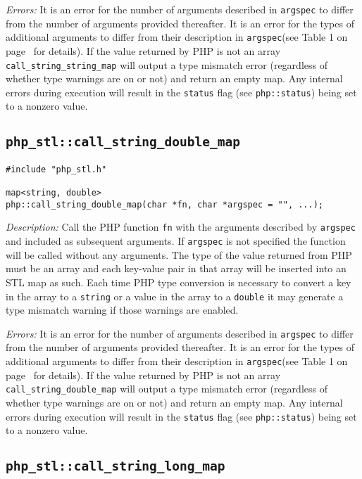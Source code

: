 \documentclass[11pt,titlepage]{article}
\begin{document}
\emph{Errors:} It is an error for the number of arguments described in \verb|argspec| to differ from the number of arguments provided thereafter. It is an error for the types of additional arguments to differ from their description in \verb|argspec|(see Table 1 on page~\pageref{Table1} for details). If the value returned by PHP is not an array \verb|call_string_string_map| will output a type mismatch error (regardless of whether type warnings are on or not) and return an empty map. Any internal errors during execution will result in the \verb|status| flag (see \verb|php::status|) being set to a nonzero value.


\subsection{\texttt{php\_stl::call\_string\_double\_map}}

\begin{verbatim}
#include "php_stl.h"

map<string, double> 
php::call_string_double_map(char *fn, char *argspec = "", ...);
\end{verbatim}

\emph{Description:} Call the PHP function \verb|fn| with the arguments described by \verb|argspec| and included as subsequent arguments. If \verb|argspec| is not specified the function will be called without any arguments. The type of the value returned from PHP must be an array and each key-value pair in that array will be inserted into an STL map as such. Each time PHP type conversion is necessary to convert a key in the array to a \verb|string| or a value in the array to a \verb|double| it may generate a type mismatch warning if those warnings are enabled.

\emph{Errors:} It is an error for the number of arguments described in \verb|argspec| to differ from the number of arguments provided thereafter. It is an error for the types of additional arguments to differ from their description in \verb|argspec|(see Table 1 on page~\pageref{Table1} for details). If the value returned by PHP is not an array \verb|call_string_double_map| will output a type mismatch error (regardless of whether type warnings are on or not) and return an empty map. Any internal errors during execution will result in the \verb|status| flag (see \verb|php::status|) being set to a nonzero value.


\subsection{\texttt{php\_stl::call\_string\_long\_map}}
\end{document}
